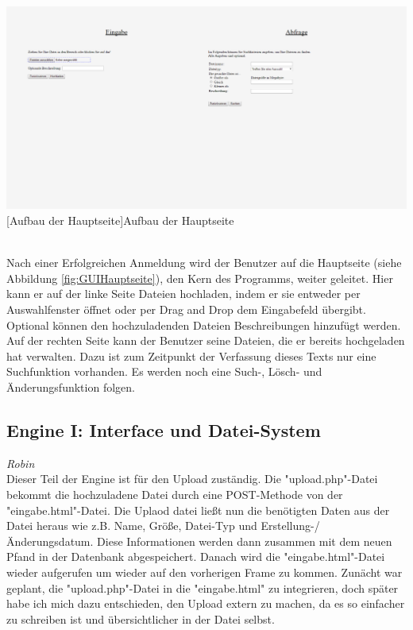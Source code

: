 \documentclass[12pt,a4paper,bibliography=totocnumbered,listof=totocnumbered]{scrartcl}
\begin{document}
\vspace{1em}
\begin{minipage}{\linewidth}
	\centering
	\includegraphics[width=0.7\linewidth]{Bilder/GUIHauptseite.png}
	[Aufbau der Hauptseite]{Aufbau der Hauptseite}
	\label{fig:GUIHauptseite}
\end{minipage}
\\

Nach einer Erfolgreichen Anmeldung wird der Benutzer auf die Hauptseite (siehe Abbildung \ref{fig:GUIHauptseite}), den Kern des Programms, weiter geleitet. Hier kann er auf der linke Seite Dateien hochladen, indem er sie entweder per Auswahlfenster öffnet oder per Drag and Drop dem Eingabefeld übergibt. Optional können den hochzuladenden Dateien Beschreibungen hinzufügt werden. Auf der rechten Seite kann der Benutzer seine Dateien, die er bereits hochgeladen hat verwalten. Dazu ist zum Zeitpunkt der Verfassung dieses Texts nur eine Suchfunktion vorhanden. Es werden noch eine Such-, Lösch- und Änderungsfunktion folgen.


\subsection{Engine I: Interface und Datei-System}
\emph{Robin}\\
Dieser Teil der Engine ist für den Upload zuständig. Die "upload.php"-Datei bekommt die hochzuladene Datei durch eine POST-Methode von der "eingabe.html"-Datei. Die Uplaod datei ließt nun die benötigten Daten aus der Datei heraus wie z.B. Name, Größe, Datei-Typ und Erstellung-/Änderungsdatum. Diese Informationen werden dann zusammen mit dem neuen Pfand in der Datenbank abgespeichert. Danach wird die "eingabe.html"-Datei wieder aufgerufen um wieder auf den vorherigen Frame zu kommen.
Zunächt war geplant, die "upload.php"-Datei in die "eingabe.html" zu integrieren, doch später habe ich mich dazu entschieden, den Upload extern zu machen, da es so einfacher zu schreiben ist und übersichtlicher in der Datei selbst.
\end{document}
